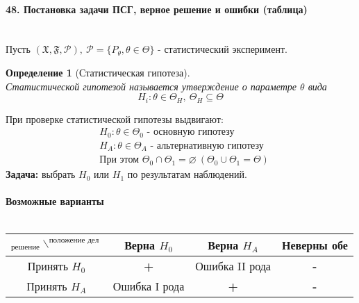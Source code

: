 \documentclass[titlepage]{article}
\newcommand{\sP}{\mathcal{P}}
\newcommand{\sF}{\mathfrak{F}}
\newcommand{\sX}{\mathfrak{X}}
\newtheorem{definition}{Определение}
\begin{document}
\paragraph{48. Постановка задачи ПСГ, верное решение и ошибки (таблица)} ~\\
Пусть $(\sX,\sF,\sP),\ \sP=\{P_\theta,\theta \in \Theta\}$ - статистический эксперимент.
\begin{definition}[Статистическая гипотеза] ~\\
	Статистической гипотезой называется утверждение о параметре $\theta$ вида
	\[H_i:\theta \in \Theta_H,\ \Theta_H \subseteq \Theta\]
\end{definition}
При проверке статистической гипотезы выдвигают:
\begin{align*}
	&H_0: \theta \in \Theta_0 \text{ - основную гипотезу}\\
	&H_A: \theta \in \Theta_A \text{ - альтернативную гипотезу}\\
	&\text{При этом } \Theta_0 \cap \Theta_1 = \varnothing\ (\Theta_0 \cup \Theta_1 = \Theta)
\end{align*}
\textbf{Задача:} выбрать $H_0$ или $H_1$ по результатам наблюдений. ~\\
\\
\textbf{Возможные варианты} ~\\
\\
\begin{tabular}{|c|c|c|c|}
	\hline
	$_\text{решение}\backslash^\text{положение дел}$ & Верна $H_0$ & Верна $H_A$ & Неверны обе \\
	\hline
	Принять $H_0$ & \textbf{+} & Ошибка II рода & \textbf{-} \\
	\hline
	Принять $H_A$ & Ошибка I рода & \textbf{+} & \textbf{-} \\
	\hline
\end{tabular}
\end{document}
